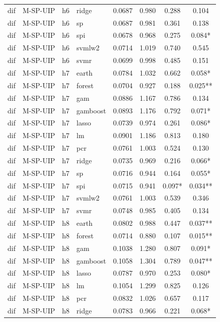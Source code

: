 \begin{ThreePartTable}
\begin{longtable}[t]{llclcccc}
dif & M-SP-UIP & h6 & ridge & 0.0687 & 0.980 & 0.288 & 0.104\\
dif & M-SP-UIP & h6 & sp & 0.0687 & 0.981 & 0.361 & 0.138\\
dif & M-SP-UIP & h6 & spi & 0.0678 & 0.968 & 0.275 & 0.084*\\
dif & M-SP-UIP & h6 & svmlw2 & 0.0714 & 1.019 & 0.740 & 0.545\\
dif & M-SP-UIP & h6 & svmr & 0.0699 & 0.998 & 0.485 & 0.151\\
\addlinespace
dif & M-SP-UIP & h7 & earth & 0.0784 & 1.032 & 0.662 & 0.058*\\
dif & M-SP-UIP & h7 & forest & 0.0704 & 0.927 & 0.188 & 0.025**\\
dif & M-SP-UIP & h7 & gam & 0.0886 & 1.167 & 0.786 & 0.134\\
dif & M-SP-UIP & h7 & gamboost & 0.0893 & 1.176 & 0.792 & 0.071*\\
dif & M-SP-UIP & h7 & lasso & 0.0739 & 0.974 & 0.261 & 0.086*\\
dif & M-SP-UIP & h7 & lm & 0.0901 & 1.186 & 0.813 & 0.180\\
dif & M-SP-UIP & h7 & pcr & 0.0761 & 1.003 & 0.524 & 0.130\\
dif & M-SP-UIP & h7 & ridge & 0.0735 & 0.969 & 0.216 & 0.066*\\
dif & M-SP-UIP & h7 & sp & 0.0716 & 0.944 & 0.164 & 0.055*\\
dif & M-SP-UIP & h7 & spi & 0.0715 & 0.941 & 0.097* & 0.034**\\
dif & M-SP-UIP & h7 & svmlw2 & 0.0761 & 1.003 & 0.539 & 0.346\\
dif & M-SP-UIP & h7 & svmr & 0.0748 & 0.985 & 0.405 & 0.134\\
\addlinespace
dif & M-SP-UIP & h8 & earth & 0.0802 & 0.988 & 0.447 & 0.037**\\
dif & M-SP-UIP & h8 & forest & 0.0714 & 0.880 & 0.107 & 0.015**\\
dif & M-SP-UIP & h8 & gam & 0.1038 & 1.280 & 0.807 & 0.091*\\
dif & M-SP-UIP & h8 & gamboost & 0.1058 & 1.304 & 0.789 & 0.047**\\
dif & M-SP-UIP & h8 & lasso & 0.0787 & 0.970 & 0.253 & 0.080*\\
dif & M-SP-UIP & h8 & lm & 0.1054 & 1.299 & 0.825 & 0.126\\
dif & M-SP-UIP & h8 & pcr & 0.0832 & 1.026 & 0.657 & 0.117\\
dif & M-SP-UIP & h8 & ridge & 0.0783 & 0.966 & 0.221 & 0.068*\\

\end{longtable}
\end{ThreePartTable}
